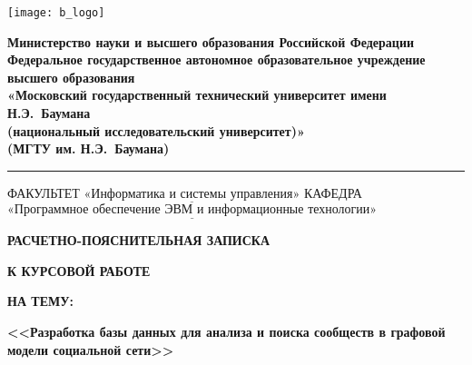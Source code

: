 \thispagestyle{empty}

\noindent \begin{minipage}{0.15\textwidth}
	\texttt{[image: b\_logo]}
\end{minipage}
\noindent\begin{minipage}{0.85\textwidth}\centering
	\textbf{Министерство науки и высшего образования Российской Федерации}\\
	\textbf{Федеральное государственное автономное образовательное учреждение высшего образования}\\
	\textbf{«Московский государственный технический университет имени Н.Э.~Баумана}\\
	\textbf{(национальный исследовательский университет)»}\\
	\textbf{(МГТУ им. Н.Э.~Баумана)}
\end{minipage}

\noindent\rule{\linewidth}{3pt}
\newline\newline
\noindent ФАКУЛЬТЕТ $\underline{\text{«Информатика и системы управления»}}$ \newline\newline
\noindent КАФЕДРА $\underline{\text{«Программное обеспечение ЭВМ и информационные технологии»}}$

\vspace{1cm}

\begin{center}
	\noindent\centering
		\Large\textbf{РАСЧЕТНО-ПОЯСНИТЕЛЬНАЯ ЗАПИСКА}
\end{center}

\begin{center}
	\noindent\centering
	\Large\textbf{К КУРСОВОЙ РАБОТЕ}
\end{center}

\begin{center}
	\noindent\centering
		\Large\textbf{НА ТЕМУ:}
\end{center}

\begin{center}
	\noindent\centering
	\Large\textbf{<<Разработка базы данных для анализа и поиска
	сообществ в графовой модели социальной сети>>}
\end{center}

\vfill
\vfill
\vfill
\vfill

